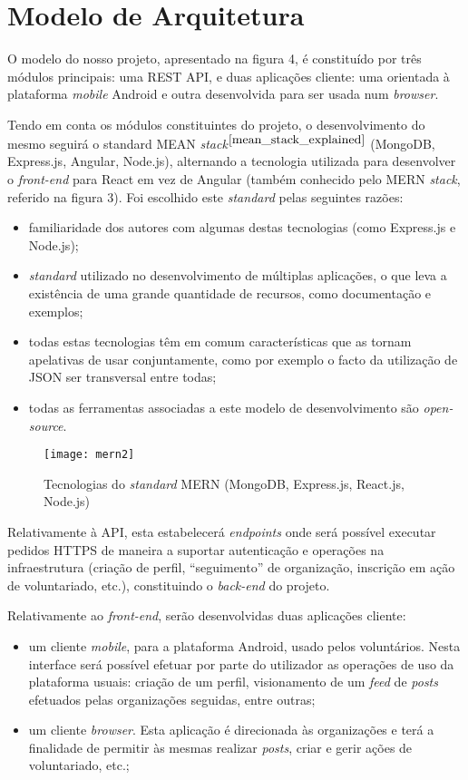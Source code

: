 \section{Modelo de Arquitetura} 
O modelo do nosso projeto, apresentado na figura 4, é constituído por três módulos principais: uma REST API, e duas aplicações cliente: uma orientada à plataforma \textit{mobile} Android e outra desenvolvida para ser usada num \textit{browser}. \par \medskip

Tendo em conta os módulos constituintes do projeto, o desenvolvimento do mesmo seguirá o standard MEAN \textit{stack}$^{\cite{mean_stack_explained}}$ (MongoDB, Express.js, Angular, Node.js), alternando a tecnologia utilizada para desenvolver o \textit{front-end} para React em vez de Angular (também conhecido pelo MERN \textit{stack}, referido na figura 3). Foi escolhido este \textit{standard} pelas seguintes razões:
\begin{itemize}
	\item familiaridade dos autores com algumas destas tecnologias (como Express.js e Node.js);
	\item \textit{standard} utilizado no desenvolvimento de múltiplas aplicações, o que leva a existência de uma grande quantidade de recursos, como documentação e exemplos;
	\item todas estas tecnologias têm em comum características que as tornam apelativas de usar conjuntamente, como por exemplo o facto da utilização de JSON ser transversal entre todas;
	\item todas as ferramentas associadas a este modelo de desenvolvimento são \textit{open-source}.
\end{itemize}

\begin{figure}[h]
	\centering
	\texttt{[image: mern2]}
	\caption{Tecnologias do \textit{standard} MERN (MongoDB, Express.js, React.js, Node.js)}
\end{figure}

Relativamente à API, esta estabelecerá \textit{endpoints} onde será possível executar pedidos HTTPS de maneira a suportar autenticação e operações na infraestrutura (criação de perfil, “seguimento” de organização, inscrição em ação de voluntariado, etc.), constituindo o \textit{back-end} do projeto.
\par \medskip

\newpage 

Relativamente ao \textit{front-end}, serão desenvolvidas duas aplicações cliente: 
\begin{itemize}
	\item um cliente \textit{mobile}, para a plataforma Android, usado pelos voluntários. Nesta interface será possível efetuar por parte do utilizador as operações de uso da plataforma usuais: criação de um perfil, visionamento de um \textit{feed} de \textit{posts} efetuados pelas organizações seguidas, entre outras;
	\item um cliente \textit{browser}. Esta aplicação é direcionada às organizações e terá a finalidade de permitir às mesmas realizar \textit{posts}, criar e gerir ações de voluntariado, etc.;
\end{itemize}

